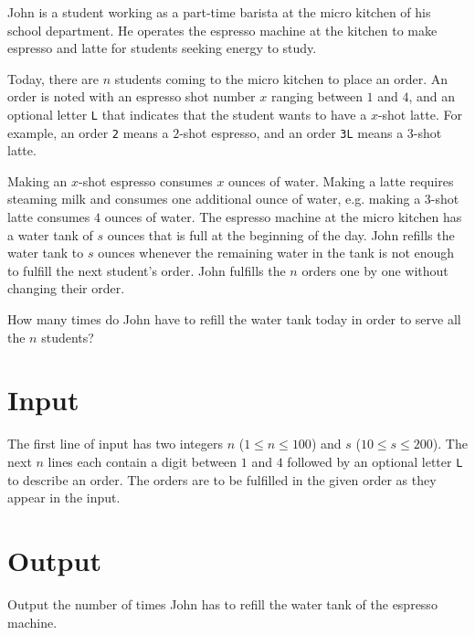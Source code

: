 
John is a student working as a part-time barista at the micro kitchen of his school department.
He operates the espresso machine at the kitchen to make espresso and latte for students seeking energy to study.

Today, there are $n$ students coming to the micro kitchen to place an order.
An order is noted with an espresso shot number $x$ ranging between $1$ and $4$, and an optional letter {\tt L} that indicates that the student wants to have a $x$-shot latte.
For example, an order {\tt 2} means a $2$-shot espresso, and an order {\tt 3L} means a $3$-shot latte.

Making an $x$-shot espresso consumes $x$ ounces of water.
Making a latte requires steaming milk and consumes one additional ounce of water, e.g. making a $3$-shot latte consumes $4$ ounces of water.
The espresso machine at the micro kitchen has a water tank of $s$ ounces that is full at the beginning of the day.
John refills the water tank to $s$ ounces whenever the remaining water in the tank is not enough to fulfill the next student's order.
John fulfills the $n$ orders one by one without changing their order.

How many times do John have to refill the water tank today in order to serve all the $n$ students?

\section*{Input}
The first line of input has two integers $n$ ($1 \leq n \leq 100$) and $s$ ($10 \leq s \leq 200$).
The next $n$ lines each contain a digit between $1$ and $4$ followed by an optional letter {\tt L} to describe an order.
The orders are to be fulfilled in the given order as they appear in the input.

\section*{Output}
Output the number of times John has to refill the water tank of the espresso machine.
